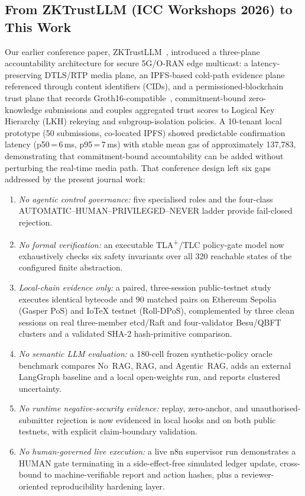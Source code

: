 \documentclass[journal]{IEEEtran}
\begin{document}
\subsection{From ZKTrustLLM (ICC Workshops 2026) to This Work}
\label{sec:gaps}
Our earlier conference paper, ZKTrustLLM~\cite{karmakerZktrustllmIccw26},
introduced a three-plane accountability architecture for secure 5G/O-RAN edge
multicast: a latency-preserving DTLS/RTP media plane, an IPFS-based cold-path
evidence plane referenced through content identifiers (CIDs), and a
permissioned-blockchain trust plane that records
Groth16-compatible~\cite{groth16}, commitment-bound zero-knowledge
submissions and couples aggregated trust
scores to Logical Key Hierarchy (LKH) rekeying and subgroup-isolation
policies. A 10-tenant local prototype (50 submissions, co-located IPFS)
showed predictable confirmation latency (p50\,=\,6\,ms, p95\,=\,7\,ms) with
stable mean gas of approximately 137{,}783, demonstrating that
commitment-bound accountability can be added without perturbing the real-time
media path.
That conference design left six gaps addressed by the present journal work:
\begin{enumerate}[leftmargin=*]
\item \emph{No agentic control governance:} five specialised roles and the
four-class AUTOMATIC--HUMAN--PRIVILEGED--NEVER ladder provide
fail-closed rejection.
\item \emph{No formal verification:} an executable
TLA\textsuperscript{+}/TLC policy-gate model now exhaustively checks six
safety invariants over all 320 reachable states of the configured finite
abstraction.
\item \emph{Local-chain evidence only:} a paired, three-session
public-testnet study executes identical bytecode and 90
matched pairs on Ethereum Sepolia (Gasper PoS) and IoTeX testnet (Roll-DPoS),
complemented by three clean sessions on real three-member etcd/Raft and
four-validator Besu/QBFT clusters and a validated SHA-2 hash-primitive
comparison.
\item \emph{No semantic LLM evaluation:} a 180-cell frozen synthetic-policy
oracle benchmark compares No~RAG, RAG, and Agentic~RAG, adds an external
LangGraph baseline and a local open-weights run, and reports clustered
uncertainty.
\item \emph{No runtime negative-security evidence:} replay, zero-anchor, and
unauthorised-submitter rejection is now evidenced in local hooks and on both
public testnets, with explicit claim-boundary validation.
\item \emph{No human-governed live execution:} a live n8n supervisor run
demonstrates a HUMAN gate terminating in a side-effect-free simulated ledger
update, cross-bound to machine-verifiable report and action hashes, plus a
reviewer-oriented reproducibility hardening layer.
\end{enumerate}
\end{document}
